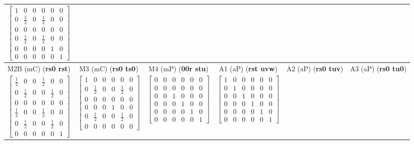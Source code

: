 \documentclass[preprint]{iucr}              %
\newcommand{\charseq}[1]{({\bf #1})}
\begin{document}
\begin{table}
\begin{tabular}{cccccc}
			$\begin{bmatrix} 1 & 0 & 0 & 0 & 0 & 0 \\ 0 & \tfrac{1}{2} & 0 & \tfrac{1}{2} & 0 & 0 \\ 0 & 0 & 0 & 0 & 0 & 0 \\ 0 & \tfrac{1}{2} & 0 & \tfrac{1}{2} & 0 & 0 \\ 0 & 0 & 0 & 0 & 1 & 0 \\ 0 & 0 & 0 & 0 & 0 & 1 \end{bmatrix}$ \\
			\midrule
			M2B (mC) \charseq{rs0 rst} & M3 (mC) \charseq{rs0 ts0} & M4 (mP) \charseq{00r stu} & A1 (aP) \charseq{rst uvw} & A2 (aP) \charseq{rs0 tuv} & A3 (aP) \charseq{rs0 tu0} \\[2pt]
			$\begin{bmatrix} \tfrac{1}{2} & 0 & 0 & \tfrac{1}{2} & 0 & 0 \\ 0 & \tfrac{1}{2} & 0 & 0 & \tfrac{1}{2} & 0 \\ 0 & 0 & 0 & 0 & 0 & 0 \\ \tfrac{1}{2} & 0 & 0 & \tfrac{1}{2} & 0 & 0 \\ 0 & \tfrac{1}{2} & 0 & 0 & \tfrac{1}{2} & 0 \\ 0 & 0 & 0 & 0 & 0 & 1 \end{bmatrix}$ &
			$\begin{bmatrix} 1 & 0 & 0 & 0 & 0 & 0 \\ 0 & \tfrac{1}{2} & 0 & 0 & \tfrac{1}{2} & 0 \\ 0 & 0 & 0 & 0 & 0 & 0 \\ 0 & 0 & 0 & 1 & 0 & 0 \\ 0 & \tfrac{1}{2} & 0 & 0 & \tfrac{1}{2} & 0 \\ 0 & 0 & 0 & 0 & 0 & 0 \end{bmatrix}$ &
			$\begin{bmatrix} 0 & 0 & 0 & 0 & 0 & 0 \\ 0 & 0 & 0 & 0 & 0 & 0 \\ 0 & 0 & 1 & 0 & 0 & 0 \\ 0 & 0 & 0 & 1 & 0 & 0 \\ 0 & 0 & 0 & 0 & 1 & 0 \\ 0 & 0 & 0 & 0 & 0 & 1 \end{bmatrix}$ &
			$\begin{bmatrix} 1 & 0 & 0 & 0 & 0 & 0 \\ 0 & 1 & 0 & 0 & 0 & 0 \\ 0 & 0 & 1 & 0 & 0 & 0 \\ 0 & 0 & 0 & 1 & 0 & 0 \\ 0 & 0 & 0 & 0 & 1 & 0 \\ 0 & 0 & 0 & 0 & 0 & 1 \end{bmatrix}$ &

\end{tabular}
\end{table}
\end{document}
